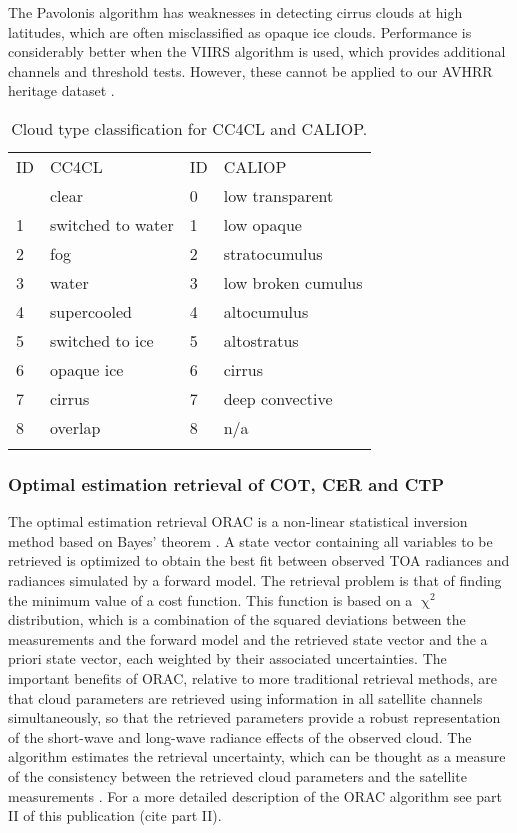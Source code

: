 The Pavolonis algorithm has weaknesses in detecting cirrus clouds at high latitudes, which are often misclassified as opaque ice clouds. Performance is considerably better when the VIIRS algorithm is used, which provides additional channels and threshold tests. However, these cannot be applied to our AVHRR heritage dataset \citep{Pavolonis05}.

\begin{table}[h]
  \caption{Cloud type classification for CC4CL and CALIOP.}
  \begin{tabular}{l|l||l|l}
    \tophline
    ID & CC4CL & ID & CALIOP \\
    \middlehline
    0 & clear & 0 & low transparent \\
    1 & switched to water & 1 & low opaque \\
    2 & fog & 2 & stratocumulus \\
    3 & water & 3 & low broken cumulus \\
    4 & supercooled & 4 & altocumulus \\
    5 & switched to ice & 5 & altostratus \\
    6 & opaque ice & 6 & cirrus \\
    7 & cirrus & 7& deep convective \\
    8 & overlap & 8 & n/a \\
    \bottomhline
  \end{tabular}
  \label{tab:cloud_types}
\end{table}

\subsubsection{Optimal estimation retrieval of COT, CER and CTP}

The optimal estimation retrieval ORAC is a non-linear statistical inversion method based on Bayes' theorem \citep{Rodgers00}. A state vector containing all variables to be retrieved is optimized to obtain the best fit between observed TOA radiances and radiances simulated by a forward model. The retrieval problem is that of finding the minimum value of a cost function. This function is based on a $\upchi^2$ distribution, which is a combination of the squared deviations between the measurements and the forward model and the retrieved state vector and the a priori state vector, each weighted by their associated uncertainties. The important benefits of ORAC, relative to more traditional retrieval methods, are that cloud parameters are retrieved using information in all satellite channels simultaneously, so that the retrieved parameters provide a robust representation of the short-wave and long-wave radiance effects of the observed cloud. The algorithm estimates the retrieval uncertainty, which can be thought as a measure of the consistency between the retrieved cloud parameters and the satellite measurements \citep{Poulsen12}. For a more detailed description of the ORAC algorithm see part II of this publication (cite part II).

